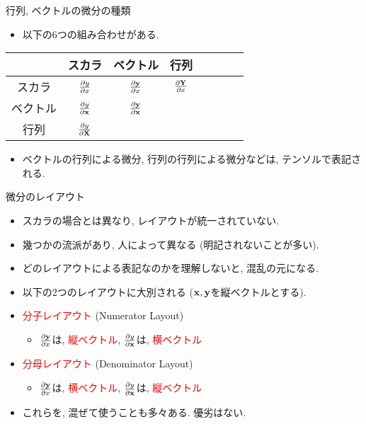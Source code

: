\documentclass[dvipdfmx,notheorems,t]{beamer}
\begin{document}
\begin{frame}{行列, ベクトルの微分の種類}
\begin{itemize}
  \item 以下の6つの組み合わせがある.
\end{itemize}

\begin{table}[h]
  \centering
  \begin{tabular}{ScScScSc} \hline
    & スカラ & ベクトル & 行列 \\ \hline
    スカラ & $\pdv{y}{x}$ & $\pdv{\vb{y}}{x}$ & $\pdv{\vb{Y}}{x}$ \\ \hline
    ベクトル & $\pdv{y}{\vb{x}}$ & $\pdv{\vb{y}}{\vb{x}}$ & \\ \hline
    行列 & $\pdv{y}{\vb{X}}$ \\ \hline
  \end{tabular}
\end{table}

\begin{itemize}
  \item ベクトルの行列による微分, 行列の行列による微分などは, テンソルで表記される.
\end{itemize}
\end{frame}

\begin{frame}{微分のレイアウト}
\begin{itemize}
  \item スカラの場合とは異なり, レイアウトが統一されていない.
  \item 幾つかの流派があり, 人によって異なる (明記されないことが多い).
  \item どのレイアウトによる表記なのかを理解しないと, 混乱の元になる.
\end{itemize}

\begin{itemize}
  \item 以下の2つのレイアウトに大別される ($\vb{x}, \vb{y}$を縦ベクトルとする).
  \item \textcolor{red}{分子レイアウト} (Numerator Layout)
  \begin{itemize}
    \item $\pdv{\vb{y}}{x}$は, \textcolor{red}{縦ベクトル},
    $\pdv{y}{\vb{x}}$は, \textcolor{red}{横ベクトル}
  \end{itemize}
  \item \textcolor{red}{分母レイアウト} (Denominator Layout)
  \begin{itemize}
    \item $\pdv{\vb{y}}{x}$は, \textcolor{red}{横ベクトル},
    $\pdv{y}{\vb{x}}$は, \textcolor{red}{縦ベクトル}
  \end{itemize}

  \item これらを, 混ぜて使うことも多々ある. 優劣はない.
\end{itemize}
\end{frame}
\end{document}
